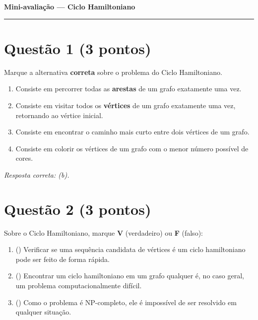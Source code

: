\documentclass[11pt,a4paper]{article}
\begin{document}
\begin{center}
  {\large\textbf{Mini-avaliação --- Ciclo Hamiltoniano}}\\
\end{center}

\hrule
\vspace{6pt}

\section*{Questão 1 \hfill (3 pontos)}

Marque a alternativa \textbf{correta} sobre o problema do Ciclo Hamiltoniano.

\begin{enumerate}[label=(\alph*),leftmargin=*]
  \item Consiste em percorrer todas as \textbf{arestas} de um grafo exatamente uma vez.
  \item Consiste em visitar todos os \textbf{vértices} de um grafo exatamente uma vez, retornando ao vértice inicial.
  \item Consiste em encontrar o caminho mais curto entre dois vértices de um grafo.
  \item Consiste em colorir os vértices de um grafo com o menor número possível de cores.
\end{enumerate}

\textit{Resposta correta: (b).}

\section*{Questão 2 \hfill (3 pontos)}

Sobre o Ciclo Hamiltoniano, marque \textbf{V} (verdadeiro) ou \textbf{F} (falso):

\begin{enumerate}[label=(\alph*),leftmargin=*,itemsep=4pt]
  \item (\hspace{1em}) Verificar se uma sequência candidata de vértices é um ciclo hamiltoniano pode ser feito de forma rápida.
  \item (\hspace{1em}) Encontrar um ciclo hamiltoniano em um grafo qualquer é, no caso geral, um problema computacionalmente difícil.
  \item (\hspace{1em}) Como o problema é NP-completo, ele é impossível de ser resolvido em qualquer situação.
\end{enumerate}
\end{document}
